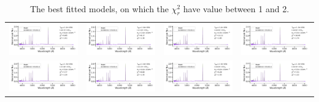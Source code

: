 \begin{table}
\centering
  \caption{The best fitted models, on which the $\chi^{2}_r$ have value between 1 and 2. \label{tab:best-model12}}\
  \begin{tabular}{l l l l }
    \includegraphics[width=0.24\linewidth, clip]{Figs/model_120000_37.41_3.78.pdf} & \includegraphics[width=0.24\linewidth, clip]{Figs/model_160000_36.58_3.30.pdf} & \includegraphics[width=0.24\linewidth, clip]{Figs/model_120000_37.25_3.65.pdf} & \includegraphics[width=0.24\linewidth, clip]{Figs/model_130000_37.25_3.74.pdf} \\
    \includegraphics[width=0.24\linewidth, clip]{Figs/model_150000_37.12_3.70.pdf} & \includegraphics[width=0.24\linewidth, clip]{Figs/model_160000_36.93_3.60.pdf} & \includegraphics[width=0.24\linewidth, clip]{Figs/model_150000_37.19_3.78.pdf} & \includegraphics[width=0.24\linewidth, clip]{Figs/model_130000_37.27_3.74.pdf} \\

\end{tabular}
\end{table}
